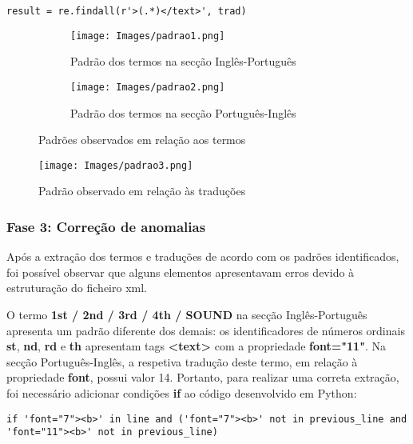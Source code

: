 \begin{lstlisting}[style=pythonstyle]
result = re.findall(r'>(.*)</text>', trad)
\end{lstlisting}

\begin{figure}[H]
    \centering
    \begin{subfigure}{0.8\textwidth}
      \centering
      \texttt{[image: Images/padrao1.png]}
      \caption{Padrão dos termos na secção Inglês-Português}
      \label{fig:padrao1}
    \end{subfigure}

    \begin{subfigure}{0.8\textwidth}
      \centering
      \texttt{[image: Images/padrao2.png]}
      \caption{Padrão dos termos na secção Português-Inglês}
      \label{fig:portugues-ingles}
    \end{subfigure}
    \caption{Padrões observados em relação aos termos}
    \label{fig:termos}
\end{figure}

\begin{figure}[H]
    \centering
    \centering
    \texttt{[image: Images/padrao3.png]}
    \caption{Padrão observado em relação às traduções}
    \label{fig:traducoes}
\end{figure}

\subsubsection{Fase 3: Correção de anomalias}

Após a extração dos termos e traduções de acordo com os padrões identificados, foi possível observar que alguns elementos apresentavam erros devido à estruturação do ficheiro xml.

O termo \textbf{1st / 2nd / 3rd / 4th / SOUND} na secção Inglês-Português apresenta um padrão diferente dos demais: os identificadores de números ordinais \textbf{st}, \textbf{nd}, \textbf{rd} e \textbf{th} apresentam tags \textbf{<text>} com a propriedade \textbf{font="11"}. Na secção Português-Inglês, a respetiva tradução deste termo, em relação à propriedade \textbf{font}, possui valor 14. Portanto, para realizar uma correta extração, foi necessário adicionar condições \textbf{if} ao código desenvolvido em Python:

\begin{lstlisting}[style=pythonstyle]
if 'font="7"><b>' in line and ('font="7"><b>' not in previous_line and 'font="11"><b>' not in previous_line)
\end{lstlisting}

